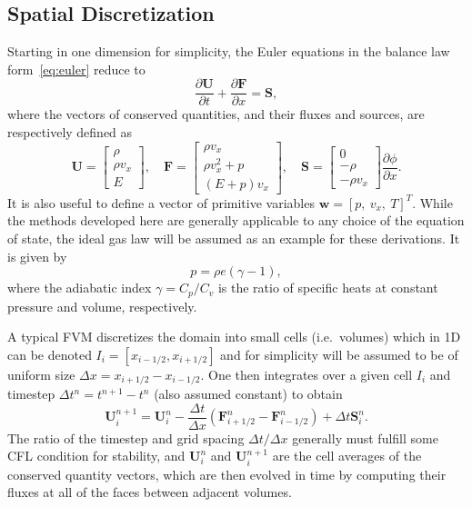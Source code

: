 \subsection{Spatial Discretization}
\label{subsec:space}

Starting in one dimension for simplicity, the Euler equations in the balance law form~\eqref{eq:euler} reduce to
\begin{equation} \label{eq:euler1D}
\frac{\partial \mathbf{U}}{\partial t}+\frac{\partial \mathbf{F}}{\partial x}=\mathbf{S},
\end{equation}
where the vectors of conserved quantities, and their fluxes and sources, are respectively defined as
\begin{equation}
\mathbf{U}=
\begin{bmatrix}
\rho \\ \rho v_x \\ E
\end{bmatrix}
,\quad \mathbf{F}=
\begin{bmatrix}
\rho v_x \\ \rho v_x^2+p \\ (E+p)v_x
\end{bmatrix}
,\quad \mathbf{S}=
\begin{bmatrix}
0 \\ -\rho \\ -\rho v_x
\end{bmatrix} \frac{\partial \phi}{\partial x}.
\end{equation}
It is also useful to define a vector of primitive variables $\mathbf{w}=[p,\ v_x,\ T]^T$. While the methods developed here are generally applicable to any choice of the equation of state, the ideal gas law will be assumed as an example for these derivations. It is given by
\begin{equation}
p=\rho e(\gamma-1),
\end{equation}
where the adiabatic index $\gamma=C_p/C_v$ is the ratio of specific heats at constant pressure and volume, respectively.

A typical FVM discretizes the domain into small cells (i.e.\ volumes) which in 1D can be denoted $I_i=[x_{i-1/2},x_{i+1/2}]$ and for simplicity will be assumed to be of uniform size $\Delta x=x_{i+1/2}-x_{i-1/2}$. One then integrates over a given cell $I_i$ and timestep $\Delta t^n=t^{n+1}-t^n$ (also assumed constant) to obtain
\begin{equation}
\mathbf{U}_i^{n+1}=\mathbf{U}_i^n-\frac{\Delta t}{\Delta x}\left(\mathbf{F}_{i+1/2}^n-\mathbf{F}_{i-1/2}^n\right)+\Delta t\mathbf{S}_i^n.
\end{equation}
The ratio of the timestep and grid spacing $\Delta t/\Delta x$ generally must fulfill some CFL condition for stability, and $\mathbf{U}_i^n$ and $\mathbf{U}_i^{n+1}$ are the cell averages of the conserved quantity vectors, which are then evolved in time by computing their fluxes at all of the faces between adjacent volumes.

